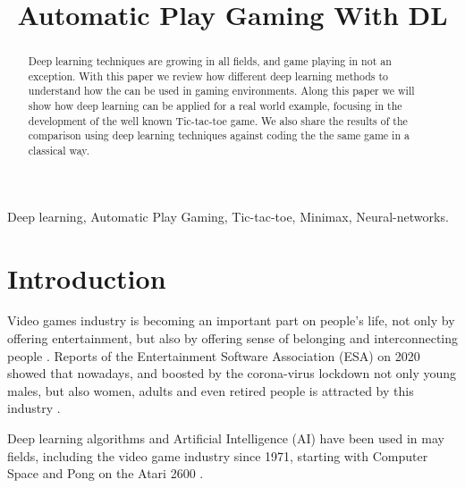 \documentclass[conference]{IEEEtran}
\begin{document}
\title{Automatic Play Gaming With DL\\
}

\author{
}

\maketitle

\begin{abstract}

Deep learning techniques are growing in all fields, and game playing in not an exception. With this paper we review how different deep learning methods to understand how the can be used in gaming environments. Along this paper we will show how deep learning can be applied for a real world example, focusing in the development of the well known Tic-tac-toe game. We also share the results of the comparison using deep learning techniques against coding the the same game in a classical way.


\end{abstract}

\begin{IEEEkeywords}
Deep learning, Automatic Play Gaming, Tic-tac-toe, Minimax, Neural-networks.
\end{IEEEkeywords}

\section{Introduction}\label{sec:intro}

Video games industry is becoming an important part on people's life, not only by offering entertainment, but also by offering sense of belonging and interconnecting people \cite{niche}. Reports of the Entertainment Software Association (ESA) on 2020 showed that nowadays, and boosted by the corona-virus lockdown  not only young males, but also women, adults and even retired people is attracted by this industry \cite{niche}.

Deep learning algorithms and Artificial Intelligence (AI) have been used in may fields, including the video game industry since 1971, starting with Computer Space and Pong on the Atari 2600 \cite{atari}.
\end{document}
